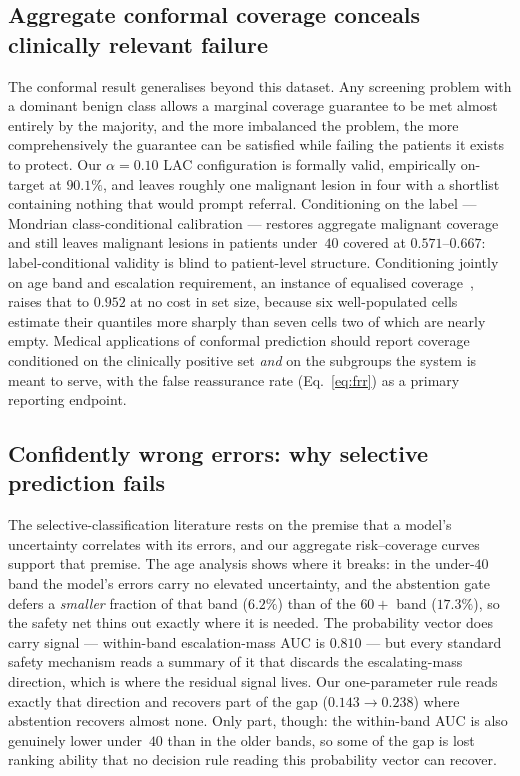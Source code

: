 \documentclass[journal]{IEEEtran}
\begin{document}
\subsection{Aggregate conformal coverage conceals clinically relevant failure}
The conformal result generalises beyond this dataset. Any screening problem with a dominant
benign class allows a marginal coverage guarantee to be met almost entirely by the majority,
and the more imbalanced the problem, the more comprehensively the guarantee can be satisfied
while failing the patients it exists to protect. Our $\alpha=0.10$ LAC configuration is
formally valid, empirically on-target at $90.1\%$, and leaves roughly one malignant lesion in
four with a shortlist containing nothing that would prompt referral. Conditioning on the
label --- Mondrian class-conditional calibration --- restores aggregate malignant coverage and
still leaves malignant lesions in patients under~$40$ covered at $0.571$--$0.667$:
label-conditional validity is blind to patient-level structure. Conditioning jointly on age
band and escalation requirement, an instance of equalised
coverage~\cite{romano2020equalized}, raises that to $0.952$ at no cost in set size, because
six well-populated cells estimate their quantiles more sharply than seven cells two of which
are nearly empty. Medical applications of conformal prediction should report coverage
conditioned on the clinically positive set \emph{and} on the subgroups the system is meant to
serve, with the false reassurance rate (Eq.~\eqref{eq:frr}) as a primary reporting endpoint.

\subsection{Confidently wrong errors: why selective prediction fails}
The selective-classification literature rests on the premise that a model's uncertainty
correlates with its errors, and our aggregate risk--coverage curves support that premise. The
age analysis shows where it breaks: in the under-$40$ band the model's errors carry no
elevated uncertainty, and the abstention gate defers a \emph{smaller} fraction of that band
($6.2\%$) than of the $60+$ band ($17.3\%$), so the safety net thins out exactly where it is
needed. The probability vector does carry signal --- within-band escalation-mass AUC is
$0.810$ --- but every standard safety mechanism reads a summary of it that discards the
escalating-mass direction, which is where the residual signal lives. Our one-parameter rule
reads exactly that direction and recovers part of the gap ($0.143 \rightarrow 0.238$) where
abstention recovers almost none. Only part, though: the within-band AUC is also genuinely
lower under~$40$ than in the older bands, so some of the gap is lost ranking ability that no
decision rule reading this probability vector can recover.
\end{document}
